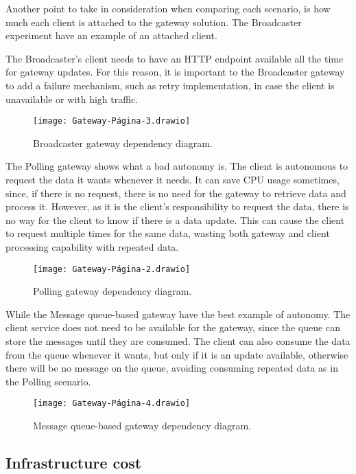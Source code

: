 Another point to take in consideration when comparing each scenario, is how much each client is attached to the gateway solution. The Broadcaster experiment have an example of an attached client.

The Broadcaster's client needs to have an HTTP endpoint available all the time for gateway updates. For this reason, it is important to the Broadcaster gateway to add a failure mechanism, such as retry implementation, in case the client is unavailable or with high traffic.

\begin{figure}
    \centering
    \texttt{[image: Gateway-Página-3.drawio]}
    \caption{Broadcaster gateway dependency diagram.\label{fig:subfigures6}}
\end{figure}

The Polling gateway shows what a bad autonomy is. The client is autonomous to request the data it wants whenever it needs. It can save CPU usage sometimes, since, if there is no request, there is no need for the gateway to retrieve data and process it. However, as it is the client's responsibility to request the data, there is no way for the client to know if there is a data update. This can cause the client to request multiple times for the same data, wasting both gateway and client processing capability with repeated data.

\begin{figure}
    \centering
    \texttt{[image: Gateway-Página-2.drawio]}
    \caption{Polling gateway dependency diagram.\label{fig:subfigures7}}
\end{figure}

While the Message queue-based gateway have the best example of autonomy. The client service does not need to be available for the gateway, since the queue can store the messages until they are consumed. The client can also consume the data from the queue whenever it wants, but only if it is an update available, otherwise there will be no message on the queue, avoiding consuming repeated data as in the Polling scenario.

\begin{figure}
    \centering
    \texttt{[image: Gateway-Página-4.drawio]}
    \caption{Message queue-based gateway dependency diagram.\label{fig:subfigures8}}
\end{figure}

\subsection*{Infrastructure cost}
\label{sec:infra}

